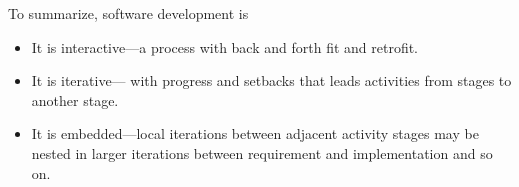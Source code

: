 To summarize, software development is
\begin{itemize}
    \item It is interactive---a process with back and forth fit and retrofit.
    \item It is iterative--- with progress and setbacks that leads activities from stages to
    another stage.

    \item It is embedded---local iterations between adjacent activity stages may be nested in
    larger iterations between requirement and implementation and so on.
\end{itemize}
